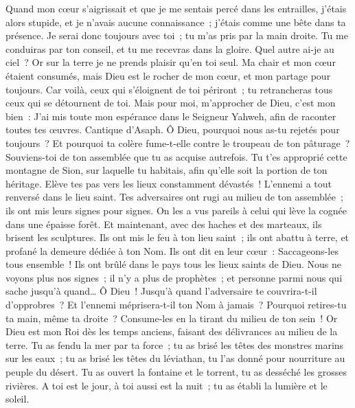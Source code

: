 \begin{multicols}{2}
Quand mon cœur s'aigrissait et que je me sentais percé dans les entrailles,
j'étais alors stupide, et je n'avais aucune connaissance~; j'étais comme une bête dans ta présence.
Je serai donc toujours avec toi~; tu m'as pris par la main droite.
Tu me conduiras par ton conseil, et tu me recevras dans la gloire.
Quel autre ai-je au ciel~? Or sur la terre je ne prends plaisir qu'en toi seul.
Ma chair et mon cœur étaient consumés, mais Dieu est le rocher de mon cœur, et mon partage pour toujours.
Car voilà, ceux qui s'éloignent de toi périront~; tu retrancheras tous ceux qui se détournent de toi.
Mais pour moi, m'approcher de Dieu, c'est mon bien~: J'ai mis toute mon espérance dans le Seigneur Yahweh, afin de raconter toutes tes œuvres.
\VerseOne{}Cantique d'Asaph. Ô Dieu, pourquoi nous as-tu rejetés pour toujours~? Et pourquoi ta colère fume-t-elle contre le troupeau de ton pâturage~?
Souviens-toi de ton assemblée que tu as acquise autrefois. Tu t'es approprié cette montagne de Sion, sur laquelle tu habitais, afin qu'elle soit la portion de ton héritage.
Elève tes pas vers les lieux constamment dévastés~! L'ennemi a tout renversé dans le lieu saint.
Tes adversaires ont rugi au milieu de ton assemblée~; ils ont mis leurs signes pour signes.
On les a vus pareils à celui qui lève la cognée dans une épaisse forêt.
Et maintenant, avec des haches et des marteaux, ils brisent les sculptures.
Ils ont mis le feu à ton lieu saint~; ils ont abattu à terre, et profané la demeure dédiée à ton Nom.
Ils ont dit en leur cœur~: Saccageons-les tous ensemble~! Ils ont brûlé dans le pays tous les lieux saints de Dieu.
Nous ne voyons plus nos signes~; il n'y a plus de prophètes~; et personne parmi nous qui sache jusqu'à quand…
Ô Dieu~! Jusqu'à quand l'adversaire te couvrira-t-il d'opprobres~? Et l'ennemi méprisera-t-il ton Nom à jamais~?
Pourquoi retires-tu ta main, même ta droite~? Consume-les en la tirant du milieu de ton sein~!
Or Dieu est mon Roi dès les temps anciens, faisant des délivrances au milieu de la terre.
Tu as fendu la mer par ta force~; tu as brisé les têtes des monstres marins sur les eaux~;
tu as brisé les têtes du léviathan, tu l'as donné pour nourriture au peuple du désert.
Tu as ouvert la fontaine et le torrent, tu as desséché les grosses rivières.
A toi est le jour, à toi aussi est la nuit~; tu as établi la lumière et le soleil.

\end{multicols}
